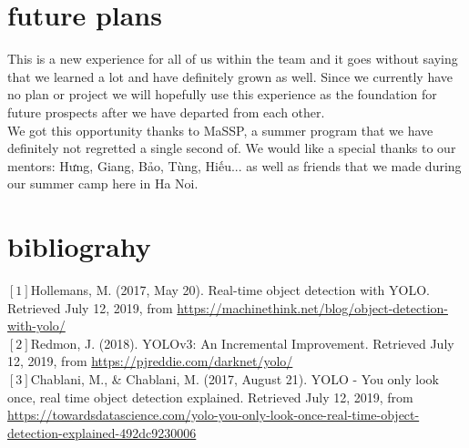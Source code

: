 \documentclass{article}
\begin{document}
\section{future plans}
\tab This is a new experience for all of us within the team and it goes without saying that we learned a lot and have definitely grown as well. Since we currently have no plan or project we will hopefully use this experience as the foundation for future prospects after we have departed from each other.\\
We got this opportunity thanks to MaSSP, a summer program that we have definitely not regretted a single second of. We would like a special thanks to our mentors: Hưng, Giang, Bảo, Tùng, Hiếu... as well as friends that we made during our summer camp here in Ha Noi.

\section{bibliograhy}
\tab $[1]$Hollemans, M. (2017, May 20). Real-time object detection with YOLO. Retrieved July 12, 2019, from \url{https://machinethink.net/blog/object-detection-with-yolo/}\\
\tab $[2]$Redmon, J. (2018). YOLOv3: An Incremental Improvement. Retrieved July 12, 2019, from \url{https://pjreddie.com/darknet/yolo/}\\
\tab $[3]$Chablani, M., \& Chablani, M. (2017, August 21). YOLO - You only look once, real time object detection explained. Retrieved July 12, 2019, from \url{https://towardsdatascience.com/yolo-you-only-look-once-real-time-object-detection-explained-492dc9230006}
\end{document}
